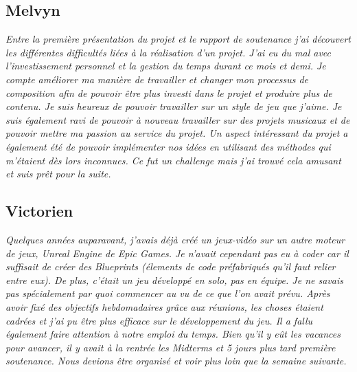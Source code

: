 \documentclass[12pt,a4paper]{article}
\begin{document}
    \subsection{Melvyn}
        \textit{Entre la première présentation du projet et le rapport de soutenance
        j'ai découvert les différentes difficultés liées à la réalisation d'un projet.
        J'ai eu du mal avec l'investissement personnel et la gestion du temps durant 
        ce mois et demi. Je compte améliorer ma manière de travailler et changer mon
        processus de composition afin de pouvoir être plus investi dans le projet et 
        produire plus de contenu. Je suis heureux de pouvoir travailler sur un style de 
        jeu que j'aime. Je suis également ravi de pouvoir à nouveau travailler sur des
        projets musicaux et de pouvoir mettre ma passion au service du projet.
        Un aspect intéressant du projet a également été de pouvoir implémenter nos idées
        en utilisant des méthodes qui m'étaient dès lors inconnues. Ce fut un challenge 
        mais j'ai trouvé cela amusant et suis prêt pour la suite.}
 
    \subsection{Victorien}
        \textit{Quelques années auparavant, j’avais déjà créé un jeux-vidéo 
        sur un autre moteur de jeux, \textsl{Unreal Engine} de \textsl{Epic Games}. 
        Je n’avait cependant pas eu à coder car il suffisait de créer des
        \textsl{Blueprints} (élements de code préfabriqués qu’il faut relier 
        entre eux). De plus, c’était un jeu développé en solo, pas en équipe.
        Je ne savais pas spécialement par quoi commencer au vu de ce que l’on
        avait prévu. Après avoir fixé des objectifs hebdomadaires grâce aux 
        réunions, les choses étaient cadrées et j’ai pu être plus efficace sur
        le développement du jeu. Il a fallu également faire attention à notre 
        emploi du temps. Bien qu’il y eût les vacances pour avancer, il y avait 
        à la rentrée les Midterms et 5 jours plus tard première soutenance. 
        Nous devions être organisé et voir plus loin que la semaine suivante.}
  
\end{document}
